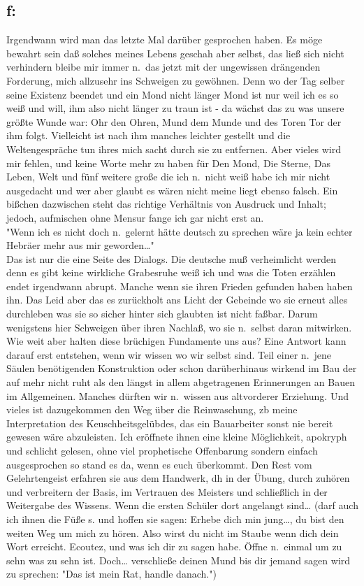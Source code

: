 \documentclass[
]{article}
\author{}
\date{\vspace{-2.5em}}
\begin{document}
\subsection{f:}\label{f}

Irgendwann wird man das letzte Mal darüber gesprochen haben. Es möge
bewahrt sein daß solches meines Lebens geschah aber selbst, das ließ
sich nicht verhindern bleibe mir immer n.~das jetzt mit der ungewissen
drängenden Forderung, mich allzusehr ins Schweigen zu gewöhnen. Denn wo
der Tag selber seine Existenz beendet und ein Mond nicht länger Mond ist
nur weil ich es so weiß und will, ihm also nicht länger zu traun ist -
da wächst das zu was unsere größte Wunde war: Ohr den Ohren, Mund dem
Munde und des Toren Tor der ihm folgt. Vielleicht ist nach ihm manches
leichter gestellt und die Weltengespräche tun ihres mich sacht durch sie
zu entfernen. Aber vieles wird mir fehlen, und keine Worte mehr zu haben
für Den Mond, Die Sterne, Das Leben, Welt und fünf weitere große die ich
n.~nicht weiß habe ich mir nicht ausgedacht und wer aber glaubt es wären
nicht meine liegt ebenso falsch. Ein bißchen dazwischen steht das
richtige Verhältnis von Ausdruck und Inhalt; jedoch, aufmischen ohne
Mensur fange ich gar nicht erst an.\\
"Wenn ich es nicht doch n.~gelernt hätte deutsch zu sprechen wäre ja
kein echter Hebräer mehr aus mir geworden\ldots"\\
Das ist nur die eine Seite des Dialogs. Die deutsche muß verheimlicht
werden denn es gibt keine wirkliche Grabesruhe weiß ich und was die
Toten erzählen endet irgendwann abrupt. Manche wenn sie ihren Frieden
gefunden haben haben ihn. Das Leid aber das es zurückholt ans Licht der
Gebeinde wo sie erneut alles durchleben was sie so sicher hinter sich
glaubten ist nicht faßbar. Darum wenigstens hier Schweigen über ihren
Nachlaß, wo sie n.~selbst daran mitwirken.\\
Wie weit aber halten diese brüchigen Fundamente uns aus? Eine Antwort
kann darauf erst entstehen, wenn wir wissen wo wir selbst sind. Teil
einer n.~jene Säulen benötigenden Konstruktion oder schon darüberhinaus
wirkend im Bau der auf mehr nicht ruht als den längst in allem
abgetragenen Erinnerungen an Bauen im Allgemeinen. Manches dürften wir
n.~wissen aus altvorderer Erziehung. Und vieles ist dazugekommen den Weg
über die Reinwaschung, zb meine Interpretation des Keuschheitsgelübdes,
das ein Bauarbeiter sonst nie bereit gewesen wäre abzuleisten. Ich
eröffnete ihnen eine kleine Möglichkeit, apokryph und schlicht gelesen,
ohne viel prophetische Offenbarung sondern einfach ausgesprochen so
stand es da, wenn es euch überkommt. Den Rest vom Gelehrtengeist
erfahren sie aus dem Handwerk, dh in der Übung, durch zuhören und
verbreitern der Basis, im Vertrauen des Meisters und schließlich in der
Weitergabe des Wissens. Wenn die ersten Schüler dort angelangt
sind\ldots{} (darf auch ich ihnen die Füße s. und hoffen sie sagen:
Erhebe dich min jung\ldots, du bist den weiten Weg um mich zu hören.
Also wirst du nicht im Staube wenn dich dein Wort erreicht. Ecoutez, und
was ich dir zu sagen habe. Öffne n.~einmal um zu sehn was zu sehn ist.
Doch\ldots{} verschließe deinen Mund bis dir jemand sagen wird zu
sprechen: "Das ist mein Rat, handle danach.")
\end{document}
